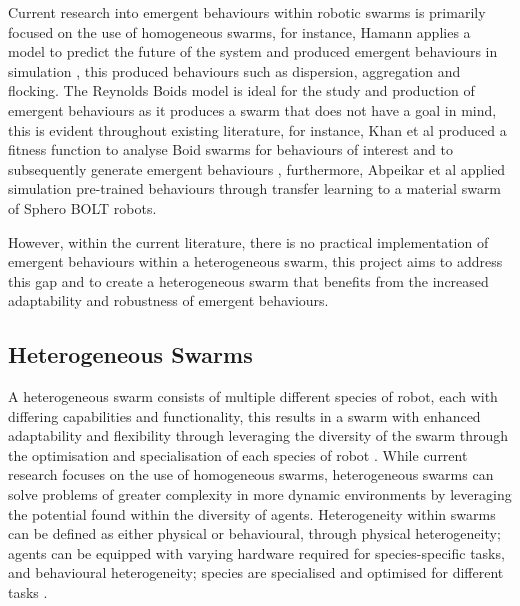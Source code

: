 \documentclass[conference]{IEEEtran}
\begin{document}
Current research into emergent behaviours within robotic swarms is primarily focused on the use of homogeneous swarms, for instance, Hamann applies a model to predict the future of the system and produced emergent behaviours in simulation \cite{hamann_evolution_2014}, this produced behaviours such as dispersion, aggregation and flocking. The Reynolds Boids model is ideal for the study and production of emergent behaviours as it produces a swarm that does not have a goal in mind, this is evident throughout existing literature, for instance, Khan et al produced a fitness function to analyse Boid swarms for behaviours of interest and to subsequently generate emergent behaviours \cite{khan_autonomous_2020}, furthermore, Abpeikar et al \cite{abpeikar_iterative_2023} applied simulation pre-trained behaviours through transfer learning to a material swarm of Sphero BOLT robots.

However, within the current literature, there is no practical implementation of emergent behaviours within a heterogeneous swarm, this project aims to address this gap and to create a heterogeneous swarm that benefits from the increased adaptability and robustness of emergent behaviours. 

\subsection{Heterogeneous Swarms}

A heterogeneous swarm consists of multiple different species of robot, each with differing capabilities and functionality, this results in a swarm with enhanced adaptability and flexibility through leveraging the diversity of the swarm through the optimisation and specialisation of each species of robot \cite{dorigo_swarmanoid_2013}. While current research focuses on the use of homogeneous swarms, heterogeneous swarms can solve problems of greater complexity in more dynamic environments by leveraging the potential found within the diversity of agents. Heterogeneity within swarms can be defined as either physical or behavioural, through physical heterogeneity; agents can be equipped with varying hardware required for species-specific tasks, and behavioural heterogeneity; species are specialised and optimised for different tasks \cite{dorigo_reflections_2020}.
\end{document}
